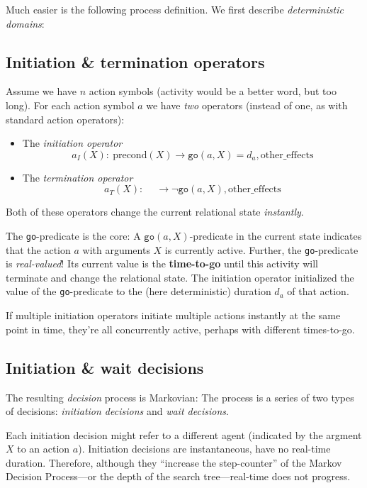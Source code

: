 \documentclass[10pt,fleqn,twoside]{article}
\newcommand{\go}{{\texttt{go}}}
\begin{document}
Much easier is the following process definition. We
first describe \emph{deterministic domains}:

\subsection{Initiation \& termination operators}

Assume we have $n$ action symbols (activity would be a better word,
but too long). For each action symbol $a$ we have \emph{two} operators
(instead of one, as with standard action operators):
\begin{itemize}
\item The \emph{initiation operator}
$$a_I(X):~ \text{precond}(X) \to \go(a,X)=d_a, \text{other\_effects}$$
\item The \emph{termination operator}
$$a_T(X):~ \quad  \to \neg\go(a,X),  \text{other\_effects}$$
\end{itemize}

Both of these operators change the current relational
state \emph{instantly}.

The \go-predicate is the core: A $\go(a,X)$-predicate in the current
state indicates that the action $a$ with arguments $X$ is currently
active. Further, the \go-predicate is \emph{real-valued}! Its current
value is the \textbf{time-to-go} until this activity will terminate
and change the relational state. The initiation operator initialized
the value of the \go-predicate to the (here deterministic) duration
$d_a$ of that action.

If multiple initiation operators initiate multiple actions instantly
at the same point in time, they're all concurrently active, perhaps
with different times-to-go.

\subsection{Initiation \& wait decisions}

The resulting \emph{decision} process is Markovian: The process is a
series of two types of decisions: \emph{initiation decisions}
and \emph{wait decisions}.

Each initiation decision might refer to a different agent (indicated
by the argment $X$ to an action $a$). Initiation decisions are
instantaneous, have no real-time duration. Therefore, although they
``increase the step-counter'' of the Markov Decision Process---or the
depth of the search tree---real-time does not progress.
\end{document}
